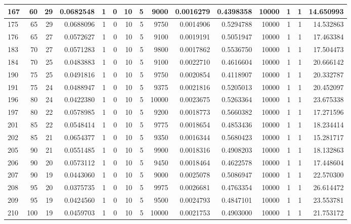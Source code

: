 \documentclass[
]{article}
\begin{document}
\begin{table}
\begin{tabular}[t]{l|r|r|r|r|r|r|r|r|r|r|r|r|r|r}
\hline
167 & 60 & 29 & 0.0682548 & 1 & 0 & 10 & 5 & 9000 & 0.0016279 & 0.4398358 & 10000 & 1 & 1 & 14.650993\\
\hline
175 & 65 & 29 & 0.0688096 & 1 & 0 & 10 & 5 & 9750 & 0.0014906 & 0.5294788 & 10000 & 1 & 1 & 14.532863\\
\hline
176 & 65 & 27 & 0.0572627 & 1 & 0 & 10 & 5 & 9100 & 0.0019191 & 0.5051947 & 10000 & 1 & 1 & 17.463384\\
\hline
183 & 70 & 27 & 0.0571283 & 1 & 0 & 10 & 5 & 9800 & 0.0017862 & 0.5536750 & 10000 & 1 & 1 & 17.504473\\
\hline
184 & 70 & 25 & 0.0483883 & 1 & 0 & 10 & 5 & 9100 & 0.0022710 & 0.4616604 & 10000 & 1 & 1 & 20.666142\\
\hline
190 & 75 & 25 & 0.0491816 & 1 & 0 & 10 & 5 & 9750 & 0.0020854 & 0.4118907 & 10000 & 1 & 1 & 20.332787\\
\hline
191 & 75 & 24 & 0.0488947 & 1 & 0 & 10 & 5 & 9375 & 0.0021816 & 0.5205013 & 10000 & 1 & 1 & 20.452097\\
\hline
196 & 80 & 24 & 0.0422380 & 1 & 0 & 10 & 5 & 10000 & 0.0023675 & 0.5263364 & 10000 & 1 & 1 & 23.675338\\
\hline
197 & 80 & 22 & 0.0578985 & 1 & 0 & 10 & 5 & 9200 & 0.0018773 & 0.5660382 & 10000 & 1 & 1 & 17.271596\\
\hline
201 & 85 & 22 & 0.0548414 & 1 & 0 & 10 & 5 & 9775 & 0.0018654 & 0.4853436 & 10000 & 1 & 1 & 18.234414\\
\hline
202 & 85 & 21 & 0.0654377 & 1 & 0 & 10 & 5 & 9350 & 0.0016344 & 0.5680423 & 10000 & 1 & 1 & 15.281717\\
\hline
205 & 90 & 21 & 0.0551485 & 1 & 0 & 10 & 5 & 9900 & 0.0018316 & 0.4908203 & 10000 & 1 & 1 & 18.132863\\
\hline
206 & 90 & 20 & 0.0573112 & 1 & 0 & 10 & 5 & 9450 & 0.0018464 & 0.4622578 & 10000 & 1 & 1 & 17.448604\\
\hline
207 & 90 & 19 & 0.0443060 & 1 & 0 & 10 & 5 & 9000 & 0.0025078 & 0.5086947 & 10000 & 1 & 1 & 22.570300\\
\hline
208 & 95 & 20 & 0.0375735 & 1 & 0 & 10 & 5 & 9975 & 0.0026681 & 0.4763354 & 10000 & 1 & 1 & 26.614472\\
\hline
209 & 95 & 19 & 0.0424560 & 1 & 0 & 10 & 5 & 9500 & 0.0024793 & 0.4847101 & 10000 & 1 & 1 & 23.553781\\
\hline
210 & 100 & 19 & 0.0459703 & 1 & 0 & 10 & 5 & 10000 & 0.0021753 & 0.4903000 & 10000 & 1 & 1 & 21.753172\\
\hline
\end{tabular}
\end{table}
\end{document}
